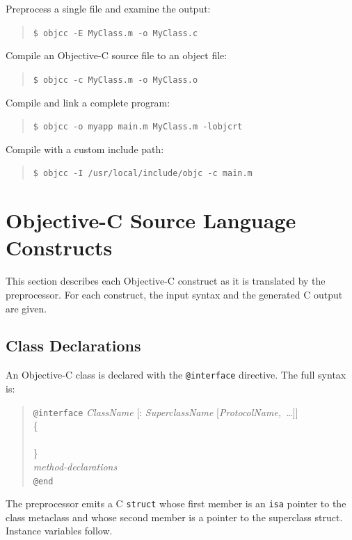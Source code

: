 \documentclass[11pt,twoside]{article}
\newcommand{\meta}[1]{{\itshape #1}}
\begin{document}
Preprocess a single file and examine the output:
\begin{quote}
{\tt \$ objcc -E MyClass.m -o MyClass.c}
\end{quote}

Compile an Objective-C source file to an object file:
\begin{quote}
{\tt \$ objcc -c MyClass.m -o MyClass.o}
\end{quote}

Compile and link a complete program:
\begin{quote}
{\tt \$ objcc -o myapp main.m MyClass.m -lobjcrt}
\end{quote}

Compile with a custom include path:
\begin{quote}
{\tt \$ objcc -I /usr/local/include/objc -c main.m}
\end{quote}

\newpage
\section{Objective-C Source Language Constructs}

This section describes each Objective-C construct as it is translated
by the preprocessor.  For each construct, the input syntax and the
generated C output are given.

\subsection{Class Declarations}

An Objective-C class is declared with the {\tt @interface} directive.
The full syntax is:
\begin{quote}
{\tt @interface} {\meta{ClassName}} [: {\meta{SuperclassName}} [{\meta{ProtocolName,~\ldots}}]]\\
\{\\
\quad {\meta{ivar-declarations}}\\
\}\\
{\meta{method-declarations}}\\
{\tt @end}
\end{quote}

The preprocessor emits a C {\tt struct} whose first member is an {\tt isa}
pointer to the class metaclass and whose second member is a pointer to the
superclass struct.  Instance variables follow.
\end{document}
